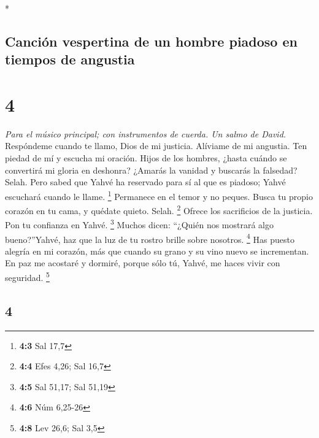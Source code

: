 \begin{paracol}{2}
\begin{otherlanguage}{english}
\end{otherlanguage}

\switchcolumn[0]*

\hypertarget{canciuxf3n-vespertina-de-un-hombre-piadoso-en-tiempos-de-angustia}{%
\subsection{Canción vespertina de un hombre piadoso en tiempos de
angustia}\label{canciuxf3n-vespertina-de-un-hombre-piadoso-en-tiempos-de-angustia}}

\hypertarget{section-6}{%
\section{4}\label{section-6}}

\emph{Para el músico principal; con instrumentos de cuerda. Un salmo de
David.}\\
 Respóndeme cuando te llamo, Dios de mi justicia. Alíviame
de mi angustia. Ten piedad de mí y escucha mi oración. 
Hijos de los hombres, ¿hasta cuándo se convertirá mi gloria en deshonra?
¿Amarás la vanidad y buscarás la falsedad? Selah.  Pero
sabed que Yahvé ha reservado para sí al que es piadoso; Yahvé escuchará
cuando le llame. \footnote{\textbf{4:3} Sal 17,7} 
Permanece en el temor y no peques. Busca tu propio corazón en tu cama, y
quédate quieto. Selah. \footnote{\textbf{4:4} Efes 4,26; Sal 16,7}
 Ofrece los sacrificios de la justicia. Pon tu confianza
en Yahvé. \footnote{\textbf{4:5} Sal 51,17; Sal 51,19} 
Muchos dicen: ``¿Quién nos mostrará algo bueno?''Yahvé, haz que la luz
de tu rostro brille sobre nosotros. \footnote{\textbf{4:6} Núm 6,25-26}
 Has puesto alegría en mi corazón, más que cuando su grano
y su vino nuevo se incrementan.  En paz me acostaré y
dormiré, porque sólo tú, Yahvé, me haces vivir con seguridad.
\footnote{\textbf{4:8} Lev 26,6; Sal 3,5}

\switchcolumn
\begin{otherlanguage}{english}

\hypertarget{section-7}{%
\section{4}\label{section-7}}


\end{otherlanguage}
\end{paracol}
